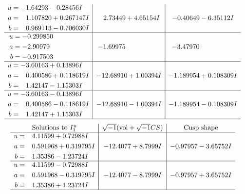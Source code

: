 \documentclass[1p]{elsarticle_modified}
\theoremstyle{definition}
\newcommand{\I}{\sqrt{-1}}
\begin{document}
$$\begin{array}{c|c|c}
\begin{aligned}
u &= -1.64293 - 0.28456 I \\
a &= \phantom{-}1.107820 + 0.267147 I \\
b &= \phantom{-}0.969113 - 0.706030 I\end{aligned}
 & \phantom{-}2.73449 + 4.65154 I & -0.40649 - 6.35112 I \\ \hline\begin{aligned}
u &= -0.299850\phantom{ +0.000000I} \\
a &= -2.90979\phantom{ +0.000000I} \\
b &= -0.917503\phantom{ +0.000000I}\end{aligned}
 & -1.69975\phantom{ +0.000000I} & -3.47970\phantom{ +0.000000I} \\ \hline\begin{aligned}
u &= -3.60163 + 0.13896 I \\
a &= \phantom{-}0.400586 + 0.118619 I \\
b &= \phantom{-}1.42147 - 1.15303 I\end{aligned}
 & -12.68910 + 1.00394 I & -1.189954 + 0.108309 I \\ \hline\begin{aligned}
u &= -3.60163 - 0.13896 I \\
a &= \phantom{-}0.400586 - 0.118619 I \\
b &= \phantom{-}1.42147 + 1.15303 I\end{aligned}
 & -12.68910 - 1.00394 I & -1.189954 - 0.108309 I\\
 \hline 
 \end{array}$$\newpage$$\begin{array}{c|c|c}  
\text{Solutions to }I^u_{1}& \I (\text{vol} + \sqrt{-1}CS) & \text{Cusp shape}\\
 \hline 
\begin{aligned}
u &= \phantom{-}4.11599 + 0.72988 I \\
a &= \phantom{-}0.591968 + 0.319795 I \\
b &= \phantom{-}1.35386 - 1.23724 I\end{aligned}
 & -12.4077 + 8.7999 I & -0.97957 - 3.65752 I \\ \hline\begin{aligned}
u &= \phantom{-}4.11599 - 0.72988 I \\
a &= \phantom{-}0.591968 - 0.319795 I \\
b &= \phantom{-}1.35386 + 1.23724 I\end{aligned}
 & -12.4077 - 8.7999 I & -0.97957 + 3.65752 I\\
 \hline 
 \end{array}$$\newpage\newpage\renewcommand{\arraystretch}{1}
\end{document}
